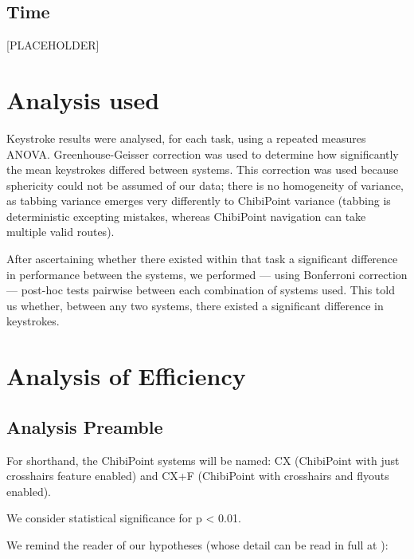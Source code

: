 \documentclass[a4paper, 12pt]{report}
\begin{document}
\subsection{Time}
[PLACEHOLDER]
\section{Analysis used}
Keystroke results were analysed, for each task, using a repeated measures ANOVA. Greenhouse-Geisser correction was used to determine how significantly the mean keystrokes differed between systems. This correction was used because sphericity could not be assumed of our data; there is no homogeneity of variance, as tabbing variance emerges very differently to ChibiPoint variance (tabbing is deterministic excepting mistakes, whereas ChibiPoint navigation can take multiple valid routes).

After ascertaining whether there existed within that task a significant difference in performance between the systems, we performed --- using Bonferroni correction --- post-hoc tests pairwise between each combination of systems used. This told us whether, between any two systems, there existed a significant difference in keystrokes.
\section{Analysis of Efficiency}
\subsection{Analysis Preamble}
For shorthand, the ChibiPoint systems will be named: CX (ChibiPoint with just crosshairs feature enabled) and CX+F (ChibiPoint with crosshairs and flyouts enabled).

We consider statistical significance for p < 0.01.

We remind the reader of our hypotheses (whose detail can be read in full at ):

\textbf{\hypone}\\
\textbf{\hyptwo}\\
\pagebreak
\end{document}
